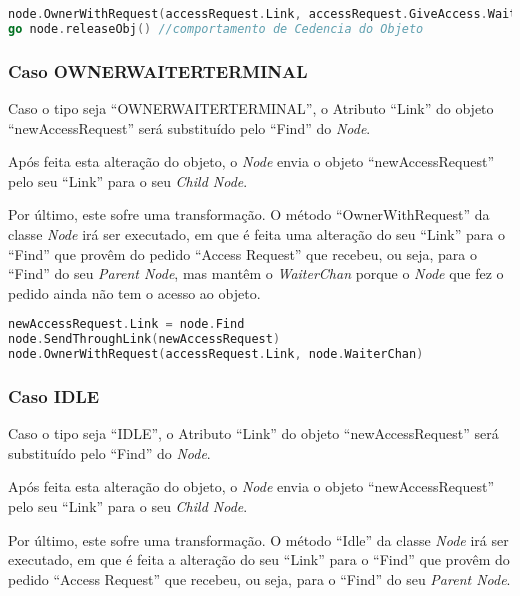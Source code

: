 \begin{lstlisting}[caption={Comportamento do \emph{Node} tipo \emph{Owner Terminal} caso receba um pedido \emph{Access Request} no \emph{Channel ``Find''}},language=Go]
node.OwnerWithRequest(accessRequest.Link, accessRequest.GiveAccess.WaiterChan) // transfomacao em Owner With Request
go node.releaseObj() //comportamento de Cedencia do Objeto
\end{lstlisting}



\subsubsection*{Caso OWNER\textunderscore WAITER\textunderscore TERMINAL}
Caso o tipo seja ``OWNER\textunderscore WAITER\textunderscore TERMINAL'', o Atributo ``Link'' do objeto ``newAccessRequest'' será substituído pelo ``Find'' do \emph{Node}.

Após feita esta alteração do objeto, o \emph{Node} envia o objeto ``newAccessRequest'' pelo seu ``Link'' para o seu \emph{Child Node}.

Por último, este sofre uma transformação. O método ``OwnerWithRequest'' da classe \emph{Node} irá ser executado, 
em que é feita uma alteração do seu ``Link'' para o ``Find'' que provêm do pedido ``Access Request'' que recebeu, ou seja, para o ``Find'' do seu \emph{Parent Node}, 
mas mantêm o \emph{WaiterChan} porque o \emph{Node} que fez o pedido ainda não tem o acesso ao objeto.


\begin{lstlisting}[caption={Comportamento do \emph{Node} tipo \emph{Owner Terminal} caso receba um pedido \emph{Access Request} no \emph{Channel ``Find''}},language=Go]
newAccessRequest.Link = node.Find
node.SendThroughLink(newAccessRequest)
node.OwnerWithRequest(accessRequest.Link, node.WaiterChan)
\end{lstlisting}



\subsubsection*{Caso IDLE}
Caso o tipo seja ``IDLE'', o Atributo ``Link'' do objeto ``newAccessRequest'' será substituído pelo ``Find'' do \emph{Node}.

Após feita esta alteração do objeto, o \emph{Node} envia o objeto ``newAccessRequest'' pelo seu ``Link'' para o seu \emph{Child Node}.

Por último, este sofre uma transformação. O método ``Idle'' da classe \emph{Node} irá ser executado,
em que é feita a alteração do seu ``Link'' para o ``Find'' que provêm do pedido ``Access Request'' que recebeu, ou seja, para o ``Find'' do seu \emph{Parent Node}.

